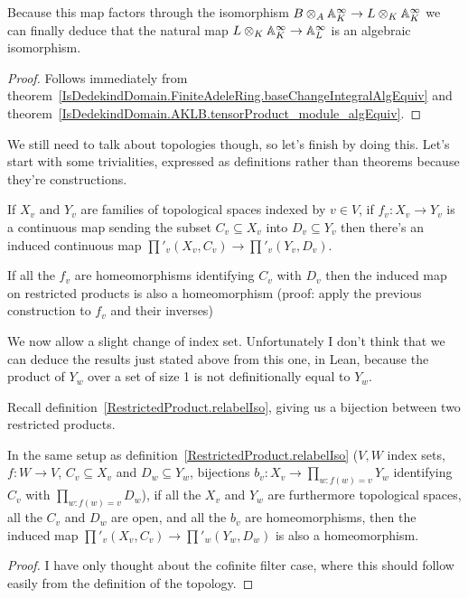 Because this map factors through the isomorphism $B\otimes_A\mathbb{A}_K^\infty\to L\otimes_K\mathbb{A}_K^\infty$
we can finally deduce that the natural map $L\otimes_K\mathbb{A}_K^\infty\to\mathbb{A}_L^\infty$ is an algebraic
  isomorphism.
\begin{proof}
  Follows immediately from theorem~\ref{IsDedekindDomain.FiniteAdeleRing.baseChangeIntegralAlgEquiv}
  and theorem~\ref{IsDedekindDomain.AKLB.tensorProduct_module_algEquiv}.
\end{proof}

We still need to talk about topologies though, so let's finish by doing this. Let's start with some trivialities, expressed as definitions rather than theorems
because they're constructions.

\begin{definition} If $X_v$ and $Y_v$ are families of topological spaces indexed by $v\in V$,
  if $f_v:X_v\to Y_v$ is a continuous map sending the subset $C_v\subseteq X_v$ into
  $D_v\subseteq Y_v$ then there's an induced continuous map $\prod'_v(X_v,C_v)\to\prod'_v(Y_v,D_v)$.
\end{definition}

\begin{definition} If all the $f_v$ are homeomorphisms identifying $C_v$ with $D_v$ then
  the induced map on restricted products is also a homeomorphism (proof: apply the previous
  construction to $f_v$ and their inverses)
\end{definition}

We now allow a slight change of index set. Unfortunately I don't think that we can deduce
the results just stated above from this one, in Lean, because the product of $Y_w$ over a
set of size 1 is not definitionally equal to $Y_w$.

Recall definition~\ref{RestrictedProduct.relabelIso}, giving us a bijection between two restricted
products.

\begin{theorem} In the same setup as definition~\ref{RestrictedProduct.relabelIso}
  ($V,W$ index sets, $f:W\to V$,
  $C_v\subseteq X_v$ and $D_w\subseteq Y_w$, bijections $b_v:X_v\to\prod_{w:f(w)=v}Y_w$
  identifying $C_v$ with $\prod_{w:f(w)=v}D_w$), if all the $X_v$ and $Y_w$ are furthermore
  topological spaces, all the $C_v$ and $D_w$ are open, and all the $b_v$ are homeomorphisms,
  then the induced
  map $\prod'_v(X_v,C_v)\to\prod'_w(Y_w,D_w)$ is also a homeomorphism.
\end{theorem}
\begin{proof} I have only thought about the cofinite filter case, where this
  should follow easily from the definition of the topology.
\end{proof}

